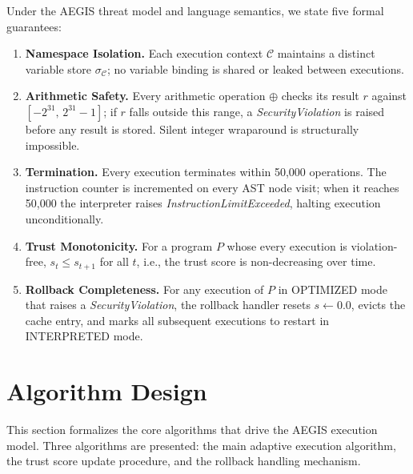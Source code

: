 \documentclass[conference]{IEEEtran}
\begin{document}
Under the AEGIS threat model and language semantics, we state five
formal guarantees:

\begin{enumerate}
  \item[\textbf{G1.}] \textbf{Namespace Isolation.} Each execution
    context $\mathcal{C}$ maintains a distinct variable store
    $\sigma_\mathcal{C}$; no variable binding is shared or leaked
    between executions.

  \item[\textbf{G2.}] \textbf{Arithmetic Safety.} Every arithmetic
    operation $\oplus$ checks its result $r$ against
    $[-2^{31},\,2^{31}-1]$; if $r$ falls outside this range, a
    \textit{SecurityViolation} is raised before any result is stored.
    Silent integer wraparound is structurally impossible.

  \item[\textbf{G3.}] \textbf{Termination.} Every execution
    terminates within 50,000 operations. The instruction counter is
    incremented on every AST node visit; when it reaches 50,000 the
    interpreter raises \textit{InstructionLimitExceeded}, halting
    execution unconditionally.

  \item[\textbf{G4.}] \textbf{Trust Monotonicity.} For a program
    $P$ whose every execution is violation-free,
    $s_t \leq s_{t+1}$ for all $t$, i.e., the trust score is
    non-decreasing over time.

  \item[\textbf{G5.}] \textbf{Rollback Completeness.} For any
    execution of $P$ in OPTIMIZED mode that raises a
    \textit{SecurityViolation}, the rollback handler resets
    $s \leftarrow 0.0$, evicts the cache entry, and marks all
    subsequent executions to restart in INTERPRETED mode.
\end{enumerate}

\section{Algorithm Design}
\label{sec:algorithms}

This section formalizes the core algorithms that drive the AEGIS
execution model. Three algorithms are presented: the main
adaptive execution algorithm, the trust score update procedure,
and the rollback handling mechanism.
\end{document}
